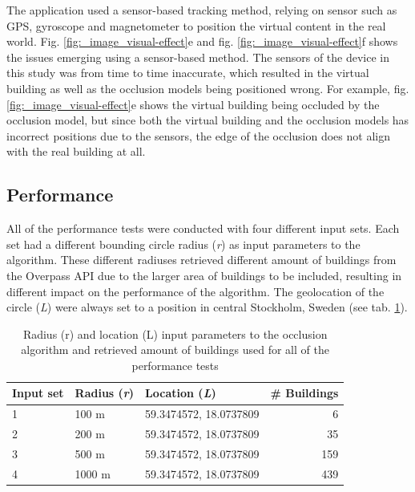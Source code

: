 The application used a sensor-based tracking method, relying on sensor such as GPS, gyroscope and magnetometer to position the virtual content in the real world. Fig. \ref{fig:_image_visual-effect}e and fig. \ref{fig:_image_visual-effect}f shows the issues emerging using a sensor-based method. The sensors of the device in this study was from time to time inaccurate, which resulted in the virtual building as well as the occlusion models being positioned wrong. For example, fig. \ref{fig:_image_visual-effect}e shows the virtual building being occluded by the occlusion model, but since both the virtual building and the occlusion models has incorrect positions due to the sensors, the edge of the occlusion does not align with the real building at all.

\subsection{Performance}
All of the performance tests were conducted with four different input sets. Each set had a different bounding circle radius (\textit{r}) as input parameters to the algorithm. These different radiuses retrieved different amount of buildings from the Overpass API due to the larger area of buildings to be included, resulting in different impact on the performance of the algorithm. The geolocation of the circle (\textit{L}) were always set to a position in central Stockholm, Sweden (see tab. \ref{tab:input_sets}).

\begin{table}
  \caption{Radius (r) and location (L) input parameters to the occlusion algorithm and retrieved amount of buildings used for all of the performance tests}
  \label{tab:input_sets}
  \begin{tabular}{lllr}
    \toprule
    Input set & Radius (\textit{r}) & Location (\textit{L}) & \# Buildings\\
    \midrule
    1 & 100 m & 59.3474572, 18.0737809 & 6\\
    2 & 200 m & 59.3474572, 18.0737809 & 35\\
    3 & 500 m & 59.3474572, 18.0737809 & 159\\
    4 & 1000 m & 59.3474572, 18.0737809 & 439\\
    \bottomrule
  \end{tabular}
\end{table}

